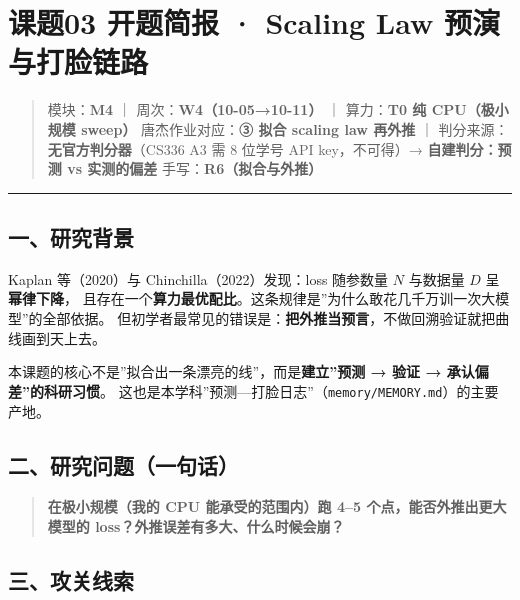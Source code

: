 \documentclass[
  chinese,
  11pt,
]{ctexart}
\begin{document}
\section{课题03 开题简报 · Scaling Law 预演与打脸链路}\label{ux8bfeux989803-ux5f00ux9898ux7b80ux62a5-scaling-law-ux9884ux6f14ux4e0eux6253ux8138ux94feux8def}

\begin{quote}
模块：\textbf{M4} ｜ 周次：\textbf{W4（10-05→10-11）} ｜ 算力：\textbf{T0 纯 CPU（极小规模 sweep）} 唐杰作业对应：\textbf{③ 拟合 scaling law 再外推} ｜ 判分来源：\textbf{无官方判分器}（CS336 A3 需 8 位学号 API key，不可得）→ \textbf{自建判分：预测 vs 实测的偏差} 手写：\textbf{R6（拟合与外推）}
\end{quote}

\begin{center}\rule{0.5\linewidth}{0.5pt}\end{center}

\subsection{一、研究背景}\label{ux4e00ux7814ux7a76ux80ccux666f-1}

Kaplan 等（2020）与 Chinchilla（2022）发现：loss 随参数量 \(N\) 与数据量 \(D\) 呈\textbf{幂律下降}， 且存在一个\textbf{算力最优配比}。这条规律是''为什么敢花几千万训一次大模型''的全部依据。 但初学者最常见的错误是：\textbf{把外推当预言}，不做回溯验证就把曲线画到天上去。

本课题的核心不是''拟合出一条漂亮的线''，而是\textbf{建立''预测 → 验证 → 承认偏差''的科研习惯}。 这也是本学科''预测---打脸日志''（\texttt{memory/MEMORY.md}）的主要产地。

\subsection{二、研究问题（一句话）}\label{ux4e8cux7814ux7a76ux95eeux9898ux4e00ux53e5ux8bdd-1}

\begin{quote}
\textbf{在极小规模（我的 CPU 能承受的范围内）跑 4--5 个点，能否外推出更大模型的 loss？外推误差有多大、什么时候会崩？}
\end{quote}

\subsection{三、攻关线索}\label{ux4e09ux653bux5173ux7ebfux7d22-1}
\end{document}
